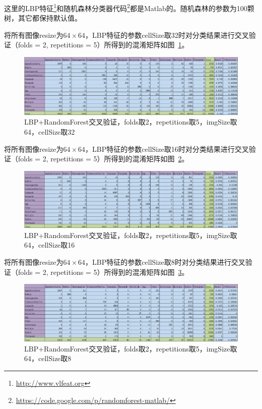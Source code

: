 \documentclass[12pt]{article}
\begin{document}
这里的LBP特征\footnote{\url{http://www.vlfeat.org}}和随机森林分类器代码\footnote{\url{https://code.google.com/p/randomforest-matlab/}}都是Matlab的。随机森林的参数为100颗树，其它都保持默认值。

将所有图像resize为$64 \times 64$，LBP特征的参数cellSize取32时对分类结果进行交叉验证（folds = 2, repetitions = 5）所得到的混淆矩阵如图~\ref{fig: LBP-RF-2-folds-5-repetitions-32-64}。
\begin{figure}[!ht]
\centering
\includegraphics[width=1.0\linewidth]{LBP-RF-2-folds-5-repetitions-32-64}
\caption{LBP+RandomForest交叉验证，folds取2，repetitions取5，imgSize取64，cellSize取32}
\label{fig: LBP-RF-2-folds-5-repetitions-32-64}
\end{figure}

将所有图像resize为$64 \times 64$，LBP特征的参数cellSize取16时对分类结果进行交叉验证（folds = 2, repetitions = 5）所得到的混淆矩阵如图~\ref{fig: LBP-RF-2-folds-5-repetitions-16-64}。
\begin{figure}[!ht]
\centering
\includegraphics[width=1.0\linewidth]{LBP-RF-2-folds-5-repetitions-16-64}
\caption{LBP+RandomForest交叉验证，folds取2，repetitions取5，imgSize取64，cellSize取16}
\label{fig: LBP-RF-2-folds-5-repetitions-16-64}
\end{figure}

将所有图像resize为$64 \times 64$，LBP特征的参数cellSize取8时对分类结果进行交叉验证（folds = 2, repetitions = 5）所得到的混淆矩阵如图~\ref{fig: LBP-RF-2-folds-5-repetitions-8-64}。
\begin{figure}[!ht]
\centering
\includegraphics[width=1.0\linewidth]{LBP-RF-2-folds-5-repetitions-8-64}
\caption{LBP+RandomForest交叉验证，folds取2，repetitions取5，imgSize取64，cellSize取8}
\label{fig: LBP-RF-2-folds-5-repetitions-8-64}
\end{figure}
\end{document}
